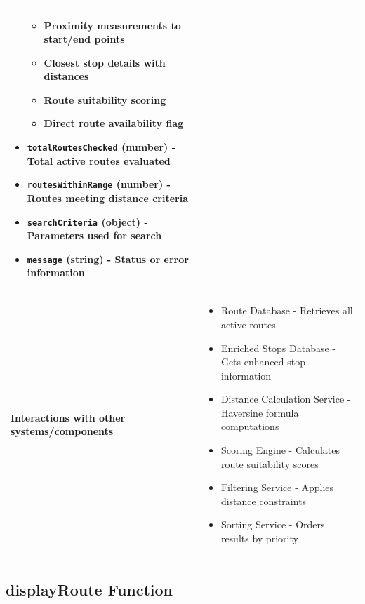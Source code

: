 \documentclass[11pt,a4paper]{article}
\begin{document}
\begin{longtable}{|p{4cm}|p{12cm}|}
\begin{itemize}[nosep]
\begin{itemize}[nosep]
  \item Proximity measurements to start/end points
  \item Closest stop details with distances
  \item Route suitability scoring
  \item Direct route availability flag
  \end{itemize}
\item \texttt{totalRoutesChecked} (number) - Total active routes evaluated
\item \texttt{routesWithinRange} (number) - Routes meeting distance criteria
\item \texttt{searchCriteria} (object) - Parameters used for search
\item \texttt{message} (string) - Status or error information
\end{itemize} \\
\hline
\textbf{Interactions with other systems/components} & 
\begin{itemize}[nosep]
\item Route Database - Retrieves all active routes
\item Enriched Stops Database - Gets enhanced stop information
\item Distance Calculation Service - Haversine formula computations
\item Scoring Engine - Calculates route suitability scores
\item Filtering Service - Applies distance constraints
\item Sorting Service - Orders results by priority
\end{itemize} \\
\hline
\end{longtable}

\subsection{displayRoute Function}
\end{document}
